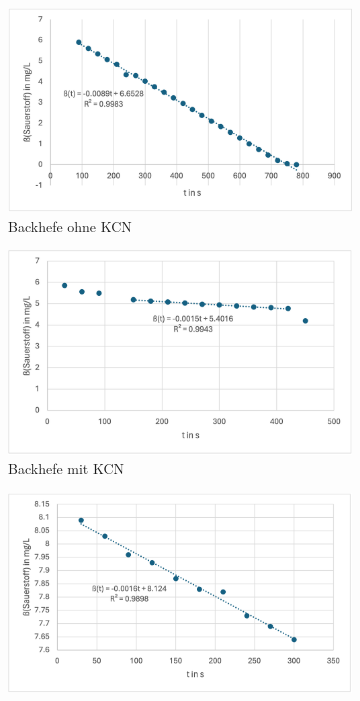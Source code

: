 \documentclass[10pt,a4paper]{article}
\begin{document}
			\begin{figure}[H]
				\centering
				\begin{subfigure}[b]{0.6\textwidth}
					\includegraphics[width=\textwidth]{O2hefeohneKCN.png}
					\caption{Backhefe ohne KCN}
					\label{fig:hefeohneKCN}
				\end{subfigure}
				\hfill
				\begin{subfigure}[b]{0.6\textwidth}
					\includegraphics[width=\textwidth]{O2hefemitKCN.png}
					\caption{Backhefe mit KCN}
					\label{fig:hefemitKCN}
				\end{subfigure}
				\begin{subfigure}[b]{0.6\textwidth}
					\includegraphics[width=\textwidth]{O2BY2ohneKCN.png}

\end{subfigure}
\end{figure}
\end{document}
